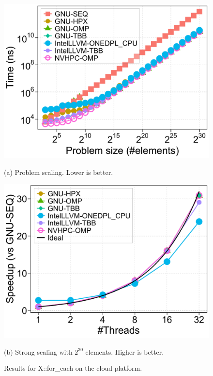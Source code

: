 \documentclass[sigconf]{acmart}
\begin{document}
\begin{figure}[H]
      \centering
      \begin{minipage}[t]{0.48\linewidth}
            \centering
            \includegraphics[width=\linewidth]{figures/problemSize_time-hetzner_amd-for_each-k1000}
            \caption*{(a) Problem scaling. Lower is better.}
      \end{minipage}
      \hfill
      \begin{minipage}[t]{0.48\linewidth}
            \centering
            \includegraphics[width=\linewidth]{figures/speedup_threads-hetzner_amd-for_each-k1000}
            \caption*{(b) Strong scaling with $2^{30}$ elements. Higher is better.}
      \end{minipage}
      \caption{Results for X::for\_each on the cloud platform.}\label{fig:cloud_speedup}
\end{figure}
\end{document}
